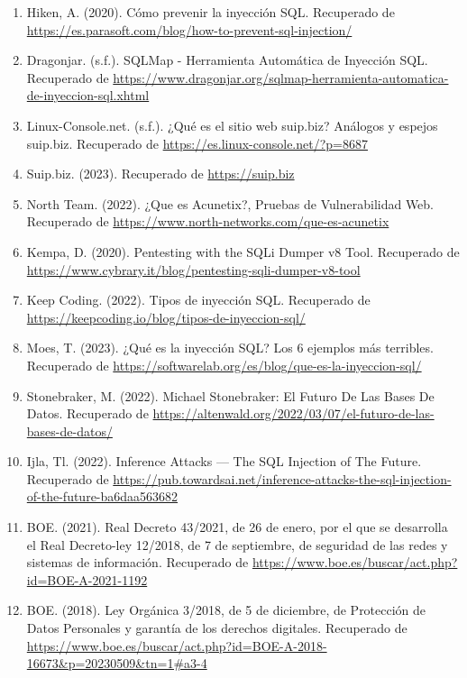 \documentclass[11pt]{report}
\begin{document}
\begin{enumerate}
\item Hiken, A. (2020). Cómo prevenir la inyección SQL. Recuperado de \url{https://es.parasoft.com/blog/how-to-prevent-sql-injection/}

\item Dragonjar. (s.f.). SQLMap - Herramienta Automática de Inyección SQL. Recuperado de \url{https://www.dragonjar.org/sqlmap-herramienta-automatica-de-inyeccion-sql.xhtml}

\item Linux-Console.net. (s.f.). ¿Qué es el sitio web suip.biz? Análogos y espejos suip.biz. Recuperado de \url{https://es.linux-console.net/?p=8687}

\item Suip.biz. (2023). Recuperado de \url{https://suip.biz}

\item North Team. (2022). ¿Que es Acunetix?, Pruebas de Vulnerabilidad Web. Recuperado de \url{https://www.north-networks.com/que-es-acunetix}

\item Kempa, D. (2020). Pentesting with the SQLi Dumper v8 Tool. Recuperado de \url{https://www.cybrary.it/blog/pentesting-sqli-dumper-v8-tool}

\item Keep Coding. (2022). Tipos de inyección SQL. Recuperado de \url{https://keepcoding.io/blog/tipos-de-inyeccion-sql/}

\item Moes, T. (2023). ¿Qué es la inyección SQL? Los 6 ejemplos más terribles. Recuperado de \url{https://softwarelab.org/es/blog/que-es-la-inyeccion-sql/}

\item Stonebraker, M. (2022). Michael Stonebraker: El Futuro De Las Bases De Datos. Recuperado de \url{https://altenwald.org/2022/03/07/el-futuro-de-las-bases-de-datos/}

\item Ijla, Tl. (2022). Inference Attacks — The SQL Injection of The Future. Recuperado de \url{https://pub.towardsai.net/inference-attacks-the-sql-injection-of-the-future-ba6daa563682}

\item BOE. (2021). Real Decreto 43/2021, de 26 de enero, por el que se desarrolla el Real Decreto-ley 12/2018, de 7 de septiembre, de seguridad de las redes y sistemas de información. Recuperado de \url{https://www.boe.es/buscar/act.php?id=BOE-A-2021-1192}

\item BOE. (2018). Ley Orgánica 3/2018, de 5 de diciembre, de Protección de Datos Personales y garantía de los derechos digitales. Recuperado de \url{https://www.boe.es/buscar/act.php?id=BOE-A-2018-16673&p=20230509&tn=1#a3-4}


\end{enumerate}
\end{document}
